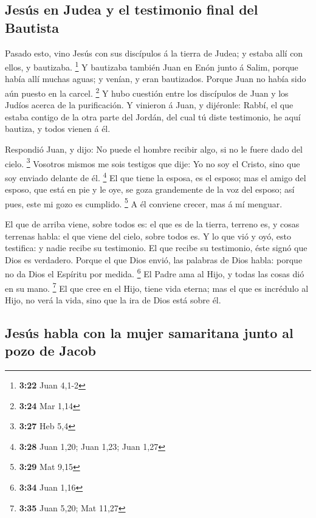 \hypertarget{jesuxfas-en-judea-y-el-testimonio-final-del-bautista}{%
\subsection{Jesús en Judea y el testimonio final del
Bautista}\label{jesuxfas-en-judea-y-el-testimonio-final-del-bautista}}

 Pasado esto, vino Jesús con sus discípulos á la tierra
de Judea; y estaba allí con ellos, y bautizaba. \footnote{\textbf{3:22}
  Juan 4,1-2}  Y bautizaba también Juan en Enón junto á
Salim, porque había allí muchas aguas; y venían, y eran bautizados.
 Porque Juan no había sido aún puesto en la carcel.
\footnote{\textbf{3:24} Mar 1,14}  Y hubo cuestión entre
los discípulos de Juan y los Judíos acerca de la purificación.
 Y vinieron á Juan, y dijéronle: Rabbí, el que estaba
contigo de la otra parte del Jordán, del cual tú diste testimonio, he
aquí bautiza, y todos vienen á él.

 Respondió Juan, y dijo: No puede el hombre recibir algo,
si no le fuere dado del cielo. \footnote{\textbf{3:27} Heb 5,4}
 Vosotros mismos me sois testigos que dije: Yo no soy el
Cristo, sino que soy enviado delante de él. \footnote{\textbf{3:28} Juan
  1,20; Juan 1,23; Juan 1,27}  El que tiene la esposa, es
el esposo; mas el amigo del esposo, que está en pie y le oye, se goza
grandemente de la voz del esposo; así pues, este mi gozo es cumplido.
\footnote{\textbf{3:29} Mat 9,15}  A él conviene crecer,
mas á mí menguar.

 El que de arriba viene, sobre todos es: el que es de la
tierra, terreno es, y cosas terrenas habla: el que viene del cielo,
sobre todos es.  Y lo que vió y oyó, esto testifica: y
nadie recibe su testimonio.  El que recibe su testimonio,
éste signó que Dios es verdadero.  Porque el que Dios
envió, las palabras de Dios habla: porque no da Dios el Espíritu por
medida. \footnote{\textbf{3:34} Juan 1,16}  El Padre ama
al Hijo, y todas las cosas dió en su mano. \footnote{\textbf{3:35} Juan
  5,20; Mat 11,27}  El que cree en el Hijo, tiene vida
eterna; mas el que es incrédulo al Hijo, no verá la vida, sino que la
ira de Dios está sobre él.

\hypertarget{jesuxfas-habla-con-la-mujer-samaritana-junto-al-pozo-de-jacob}{%
\subsection{Jesús habla con la mujer samaritana junto al pozo de
Jacob}\label{jesuxfas-habla-con-la-mujer-samaritana-junto-al-pozo-de-jacob}}

